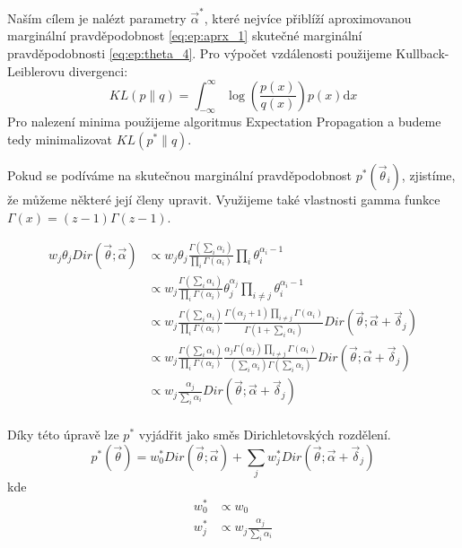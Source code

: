 Naším cílem je nalézt parametry $\vec{\alpha}^*$, které nejvíce přiblíží
aproximovanou marginální pravděpodobnost \eqref{eq:ep:aprx_1} skutečné
marginální pravděpodobnosti \eqref{eq:ep:theta_4}. Pro výpočet vzdálenosti
použijeme Kullback-Leiblerovu divergenci:
\begin{equation}
KL(p \| q) = \int_{-\infty}^{\infty} \log\left(\frac{p(x)}{q(x)}\right)p(x)
    \mathrm{d}x
\end{equation}
Pro nalezení minima použijeme algoritmus Expectation Propagation a budeme tedy
minimalizovat $KL(p^*\| q)$.

Pokud se podíváme na skutečnou marginální pravděpodobnost
$p^*(\vec{\theta}_i)$, zjistíme, že můžeme některé její členy upravit.
Využijeme také vlastnosti gamma funkce $\Gamma(x) = (z-1) \Gamma(z-1)$.

\begin{align}
w_j \theta_j Dir(\vec{\theta}; \vec{\alpha}) &\propto
    w_j \theta_j \frac{\Gamma (\sum_i \alpha_{i})}{\prod_i \Gamma(\alpha_i)}
    \prod_i \theta_{i}^{\alpha_{i} - 1} \\
&\propto w_j \frac{\Gamma (\sum_i \alpha_{i})} {\prod_i
    \Gamma(\alpha_{i})} \theta_j^{\alpha_j} \prod_{i \ne j}
    \theta_{i}^{\alpha_{i} - 1} \\
&\propto w_j
    \frac{\Gamma (\sum_i \alpha_{i})}
         {\prod_i \Gamma(\alpha_{i})}
    \frac{\Gamma(\alpha_{j} + 1) \prod_{i \ne j} \Gamma(\alpha_i)}
         {\Gamma (1 + \sum_i \alpha_i)}
    Dir(\vec\theta; \vec{\alpha} + \vec{\delta}_j) \\
&\propto w_j
    \frac{\Gamma (\sum_i \alpha_{i})}
         {\prod_i \Gamma(\alpha_{i})}
    \frac{\alpha_j \Gamma(\alpha_j) \prod_{i \ne j} \Gamma(\alpha_i)}
         {(\sum_i \alpha_i) \Gamma (\sum_i \alpha_i)}
    Dir(\vec\theta; \vec{\alpha} + \vec{\delta}_j) \\
&\propto w_j
    \frac{\alpha_j}
         {\sum_i \alpha_i}
    Dir(\vec\theta; \vec{\alpha} + \vec{\delta}_j) \\
\end{align}

Díky této úpravě lze $p^*$ vyjádřit jako směs Dirichletovských rozdělení.
\begin{equation}
p^*(\vec{\theta}) =
    w_0^* Dir(\vec{\theta}; \vec{\alpha}) +
    \sum_j w^*_j
        Dir(\vec{\theta}; \vec{\alpha} + \vec{\delta}_j)
\label{eq:marginaltheta}
\end{equation}
kde
\begin{align}
    w^*_0 &\propto w_0 \\
    w^*_j &\propto w_j \frac{\alpha_j}{\sum_i \alpha_i}
\end{align}

